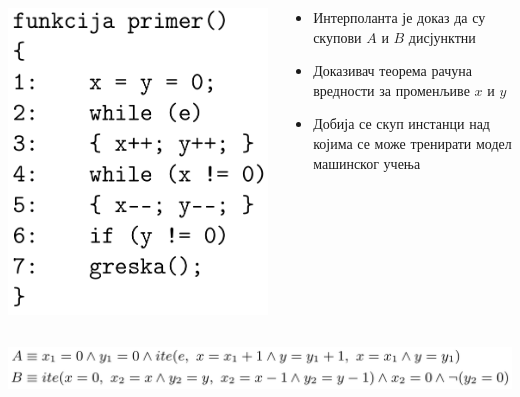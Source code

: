\documentclass{beamer}
\begin{document}
\begin{frame}[fragile]
\begin{columns}
\begin{column}{0.3\textwidth}
    \begin{center}
        \includegraphics[scale=0.17]{./slike/interpolant_code2.png}
    \end{center}
\end{column}
\begin{column}{0.7\textwidth}  %
	\begin{itemize}
    \item Интерполанта је доказ да су скупови $A$ и  $B$ дисјунктни
    \item Доказивач теорема рачуна вредности за променљиве $x$ и  $y$
    \item Добија се скуп инстанци над којима се може тренирати модел машинског учења
    \end{itemize}
\end{column}
\end{columns}

\begin{center}
    \includegraphics[scale=0.24]{./slike/theformula.png}
\end{center}


\end{frame}
\end{document}
